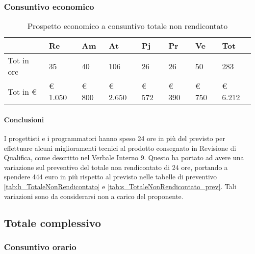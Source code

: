 		\subsubsection{Consuntivo economico}
						\begin{table}[H] \begin{center} \begin{tabular}{llllllll}
						\toprule
							&	\textbf{Re}	&	\textbf{Am}	&	\textbf{At}	&	\textbf{Pj}	&	\textbf{Pr}	&	\textbf{Ve}	&	\textbf{Tot}\\
			
						\midrule
						Tot in ore	&	35		&	40		&	106		&	26		&	26		&	50		&	283	\\
						Tot in €	&	 € 1.050 		 & 	 € 800 		 & 	 € 2.650 		 & 	 € 572 		 & 	 € 390 		 & 	 € 750 		 & 	 € 6.212 	\\

						\bottomrule
						\end{tabular} \end{center} \caption{Prospetto economico a consuntivo totale non rendicontato 
						} \end{table}
					
			\paragraph{Conclusioni}
			I progettisti e i programmatori hanno speso 24 ore in più del previsto per effettuare alcuni miglioramenti tecnici al prodotto consegnato in Revisione di Qualifica, come descritto nel Verbale Interno 9. Questo ha portato ad avere una variazione sul preventivo del totale non rendicontato di 24 ore, portando a spendere 444 euro in più rispetto al previsto nelle tabelle di preventivo \ref{tab:h_TotaleNonRendicontato} e  \ref{tab:s_TotaleNonRendicontato_prev}. Tali variazioni sono da considerarsi non a carico del proponente.
	
	\newpage
	\subsection{Totale complessivo}
		\subsubsection{Consuntivo orario}

